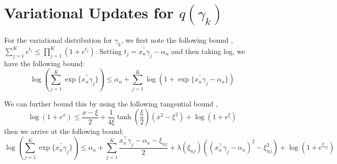 \documentclass[twoside,11pt]{article}
\begin{document}

\section{Variational Updates for $q(\gamma_k)$} \label{app:gamma}  



For the variational distribution for $\gamma_k$, we first note the following bound \parencite{bouchard:07}, $\sum_{j = 1}^{K} e^{t_j} \leq \prod_{j = 1}^K (1 + e^{t_j})$. Setting $t_j = x_n^{^\intercal} \gamma_j - \alpha_{n}$ and then taking log, we have the following bound:
\begin{equation} \label{eq:log-sum-exp}
	\log \left( \sum_{j = 1}^K \exp\{ x_n^{^\intercal} \gamma_j \}\right) \leq \alpha_n + \sum_{j=1}^K \log \left( 1 + \exp \{ x_n^{^\intercal} \gamma_j - \alpha_n \}\right)
\end{equation}


We can further bound this by using the following tangential bound \parencite{jj:2001}, $$\log(1 + e^x) \leq \frac{x - \xi}{2} + \frac{1}{4\xi} \tanh \left( \frac{\xi}{2} \right) (x^2 - \xi^2) + \log\left(1 + e^{\xi}\right)$$ then we arrive at the following bound: 
\begin{equation} \label{eq:jj_bound}
	\log \left( \sum_{j = 1}^K \exp\{ x_n^{^\intercal} \gamma_j \}\right) \leq 
\alpha_n + \sum_{j = 1}^K \frac{x_n^{\intercal} \gamma_j - \alpha_n - \xi_{nj}}{2} + \lambda(\xi_{nj}) \left( (x_n^{\intercal} \gamma_j - \alpha_n)^2 - \xi_{nj}^2\right) + \log \left( 1 + e^{\xi_{nj}}\right)
\end{equation}
\end{document}
